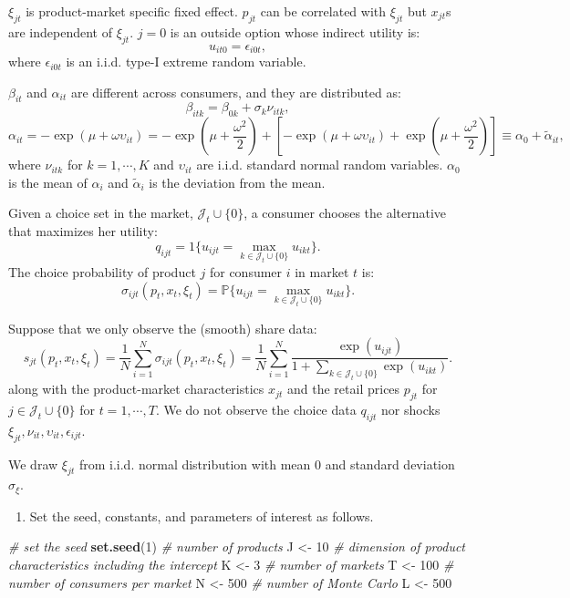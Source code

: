 \documentclass[
]{book}
\newenvironment{Shaded}{\begin{snugshade}}{\end{snugshade}}
\newcommand{\CommentTok}[1]{\textcolor[rgb]{0.56,0.35,0.01}{\textit{#1}}}
\newcommand{\DecValTok}[1]{\textcolor[rgb]{0.00,0.00,0.81}{#1}}
\newcommand{\FunctionTok}[1]{\textcolor[rgb]{0.13,0.29,0.53}{\textbf{#1}}}
\newcommand{\NormalTok}[1]{#1}
\newcommand{\OtherTok}[1]{\textcolor[rgb]{0.56,0.35,0.01}{#1}}
\providecommand{\tightlist}{%
  \setlength{\itemsep}{0pt}\setlength{\parskip}{0pt}}
\begin{document}
\(\xi_{jt}\) is product-market specific fixed effect. \(p_{jt}\) can be correlated with \(\xi_{jt}\) but \(x_{jt}\)s are independent of \(\xi_{jt}\). \(j = 0\) is an outside option whose indirect utility is:
\[
u_{it0} = \epsilon_{i0t},
\]
where \(\epsilon_{i0t}\) is an i.i.d. type-I extreme random variable.

\(\beta_{it}\) and \(\alpha_{it}\) are different across consumers, and they are distributed as:
\[
\beta_{itk} = \beta_{0k} + \sigma_k \nu_{itk},
\]
\[
\alpha_{it} = - \exp(\mu + \omega \upsilon_{it}) = - \exp(\mu + \frac{\omega^2}{2}) + [- \exp(\mu + \omega \upsilon_{it}) + \exp(\mu + \frac{\omega^2}{2})] \equiv \alpha_0 + \tilde{\alpha}_{it},
\]
where \(\nu_{itk}\) for \(k = 1, \cdots, K\) and \(\upsilon_{it}\) are i.i.d. standard normal random variables. \(\alpha_0\) is the mean of \(\alpha_i\) and \(\tilde{\alpha}_i\) is the deviation from the mean.

Given a choice set in the market, \(\mathcal{J}_t \cup \{0\}\), a consumer chooses the alternative that maximizes her utility:
\[
q_{ijt} = 1\{u_{ijt} = \max_{k \in \mathcal{J}_t \cup \{0\}} u_{ikt}\}.
\]
The choice probability of product \(j\) for consumer \(i\) in market \(t\) is:
\[
\sigma_{ijt}(p_t, x_t, \xi_t) = \mathbb{P}\{u_{ijt} = \max_{k \in \mathcal{J}_t \cup \{0\}} u_{ikt}\}.
\]

Suppose that we only observe the (smooth) share data:
\[
s_{jt}(p_t, x_t, \xi_t) = \frac{1}{N} \sum_{i = 1}^N \sigma_{ijt}(p_t, x_t, \xi_t) = \frac{1}{N} \sum_{i = 1}^N \frac{\exp(u_{ijt})}{1 + \sum_{k \in \mathcal{J}_t \cup \{0\}} \exp(u_{ikt})}. 
\]
along with the product-market characteristics \(x_{jt}\) and the retail prices \(p_{jt}\) for \(j \in \mathcal{J}_t \cup \{0\}\) for \(t = 1, \cdots, T\). We do not observe the choice data \(q_{ijt}\) nor shocks \(\xi_{jt}, \nu_{it}, \upsilon_{it}, \epsilon_{ijt}\).

We draw \(\xi_{jt}\) from i.i.d. normal distribution with mean 0 and standard deviation \(\sigma_{\xi}\).

\begin{enumerate}
\def\labelenumi{\arabic{enumi}.}
\tightlist
\item
  Set the seed, constants, and parameters of interest as follows.
\end{enumerate}

\begin{Shaded}
\begin{Highlighting}[]
\CommentTok{\# set the seed}
\FunctionTok{set.seed}\NormalTok{(}\DecValTok{1}\NormalTok{)}
\CommentTok{\# number of products}
\NormalTok{J }\OtherTok{\textless{}{-}} \DecValTok{10}
\CommentTok{\# dimension of product characteristics including the intercept}
\NormalTok{K }\OtherTok{\textless{}{-}} \DecValTok{3}
\CommentTok{\# number of markets}
\NormalTok{T }\OtherTok{\textless{}{-}} \DecValTok{100}
\CommentTok{\# number of consumers per market}
\NormalTok{N }\OtherTok{\textless{}{-}} \DecValTok{500}
\CommentTok{\# number of Monte Carlo}
\NormalTok{L }\OtherTok{\textless{}{-}} \DecValTok{500}
\end{Highlighting}
\end{Shaded}
\end{document}
